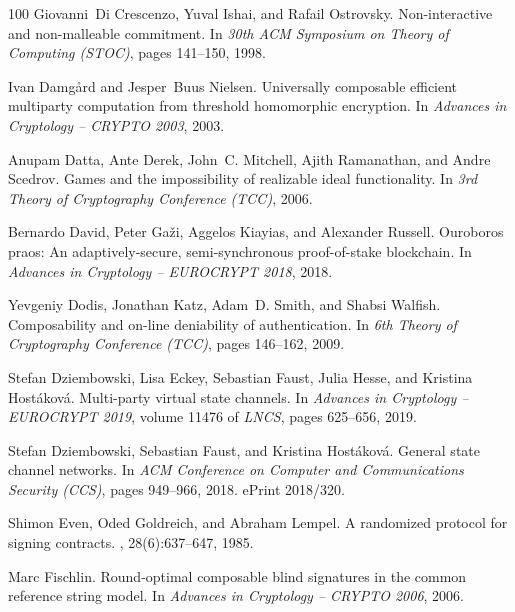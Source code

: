 \documentclass[11pt,a4paper]{article}
\begin{document}
\begin{thebibliography}{100}
Giovanni~Di Crescenzo, Yuval Ishai, and Rafail Ostrovsky.
\newblock Non-interactive and non-malleable commitment.
\newblock In {\em 30th ACM Symposium on Theory of Computing (STOC)}, pages
  141--150, 1998.

Ivan Damg{\aa}rd and Jesper~Buus Nielsen.
\newblock Universally composable efficient multiparty computation from
  threshold homomorphic encryption.
\newblock In {\em Advances in Cryptology -- CRYPTO 2003}, 2003.

Anupam Datta, Ante Derek, John~C. Mitchell, Ajith Ramanathan, and Andre
  Scedrov.
\newblock Games and the impossibility of realizable ideal functionality.
\newblock In {\em 3rd Theory of Cryptography Conference (TCC)}, 2006.

Bernardo David, Peter Ga{\v z}i, Aggelos Kiayias, and Alexander Russell.
\newblock Ouroboros praos: An adaptively-secure, semi-synchronous
  proof-of-stake blockchain.
\newblock In {\em Advances in Cryptology -- EUROCRYPT 2018}, 2018.

Yevgeniy Dodis, Jonathan Katz, Adam~D. Smith, and Shabsi Walfish.
\newblock Composability and on-line deniability of authentication.
\newblock In {\em 6th Theory of Cryptography Conference (TCC)}, pages 146--162,
  2009.

Stefan Dziembowski, Lisa Eckey, Sebastian Faust, Julia Hesse, and Kristina
  Host{\'a}kov{\'a}.
\newblock Multi-party virtual state channels.
\newblock In {\em Advances in Cryptology -- EUROCRYPT 2019}, volume 11476 of
  {\em LNCS}, pages 625--656, 2019.

Stefan Dziembowski, Sebastian Faust, and Kristina Host{\'a}kov{\'a}.
\newblock General state channel networks.
\newblock In {\em ACM Conference on Computer and Communications Security
  (CCS)}, pages 949--966, 2018.
\newblock ePrint 2018/320.

Shimon Even, Oded Goldreich, and Abraham Lempel.
\newblock A randomized protocol for signing contracts.
, 28(6):637--647, 1985.

Marc Fischlin.
\newblock Round-optimal composable blind signatures in the common reference
  string model.
\newblock In {\em Advances in Cryptology -- CRYPTO 2006}, 2006.


\end{thebibliography}
\end{document}
